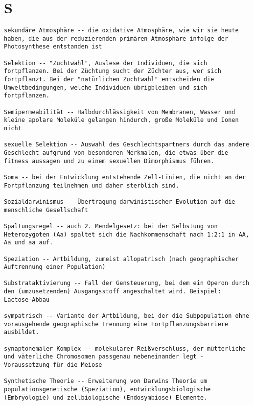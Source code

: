 \documentclass{article}
\begin{document}
\section{S}
\begin{verbatim}
sekundäre Atmosphäre -- die oxidative Atmosphäre, wie wir sie heute haben, die aus der reduzierenden primären Atmosphäre infolge der Photosynthese entstanden ist

Selektion -- "Zuchtwahl", Auslese der Individuen, die sich fortpflanzen. Bei der Züchtung sucht der Züchter aus, wer sich fortpflanzt. Bei der "natürlichen Zuchtwahl" entscheiden die Umweltbedingungen, welche Individuen übrigbleiben und sich fortpflanzen.

Semipermeabilität -- Halbdurchlässigkeit von Membranen, Wasser und kleine apolare Moleküle gelangen hindurch, große Moleküle und Ionen nicht

sexuelle Selektion -- Auswahl des Geschlechtspartners durch das andere Geschlecht aufgrund von besonderen Merkmalen, die etwas über die fitness aussagen und zu einem sexuellen Dimorphismus führen.

Soma -- bei der Entwicklung entstehende Zell-Linien, die nicht an der Fortpflanzung teilnehmen und daher sterblich sind.

Sozialdarwinismus -- Übertragung darwinistischer Evolution auf die menschliche Gesellschaft

Spaltungsregel -- auch 2. Mendelgesetz: bei der Selbstung von Heterozygoten (Aa) spaltet sich die Nachkommenschaft nach 1:2:1 in AA, Aa und aa auf.

Speziation -- Artbildung, zumeist allopatrisch (nach geographischer Auftrennung einer Population)

Substrataktivierung -- Fall der Gensteuerung, bei dem ein Operon durch den (umzusetzenden) Ausgangsstoff angeschaltet wird. Beispiel: Lactose-Abbau

sympatrisch -- Variante der Artbildung, bei der die Subpopulation ohne vorausgehende geographische Trennung eine Fortpflanzungsbarriere ausbildet.

synaptonemaler Komplex -- molekularer Reißverschluss, der mütterliche und väterliche Chromosomen passgenau nebeneinander legt - Voraussetzung für die Meiose

Synthetische Theorie -- Erweiterung von Darwins Theorie um populationsgenetische (Speziation), entwicklungsbiologische (Embryologie) und zellbiologische (Endosymbiose) Elemente.
\end{verbatim}
\newpage
\end{document}
